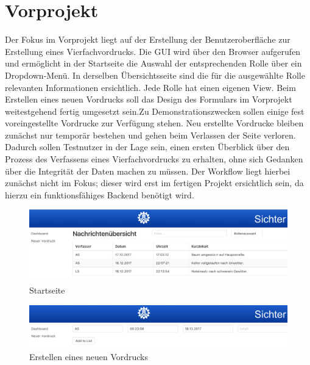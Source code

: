\section{Vorprojekt}
Der Fokus im Vorprojekt liegt auf der Erstellung der Benutzeroberfläche zur Erstellung eines Vierfachvordrucks. 
Die GUI wird über den Browser aufgerufen und ermöglicht in der Startseite die Auswahl der entsprechenden Rolle über 
ein Dropdown-Menü. In derselben Übersichtsseite sind die für die ausgewählte Rolle relevanten Informationen ersichtlich. 
Jede Rolle hat einen eigenen View. Beim Erstellen eines neuen Vordrucks soll das Design des Formulars im Vorprojekt 
weitestgehend fertig umgesetzt sein.Zu Demonstrationszwecken sollen einige fest voreingestellte Vordrucke zur Verfügung stehen. Neu erstellte Vordrucke bleiben zunächst nur temporär bestehen und gehen beim Verlassen der Seite verloren. Dadurch sollen Testnutzer in der Lage sein, einen ersten Überblick über den Prozess des Verfassens eines Vierfachvordrucks zu erhalten,
ohne sich Gedanken über die Integrität der Daten machen zu müssen. Der Workflow liegt hierbei zunächst nicht im Fokus; dieser wird erst im fertigen Projekt ersichtlich sein, da hierzu ein funktionsfähiges Backend benötigt wird.

    \begin{figure}[htpb]
        \centering
        \includegraphics[width=0.95\linewidth]{vorprojekt_01.png}
        \caption{Startseite}
    \end{figure}


    \begin{figure}[htpb]
        \centering
        \includegraphics[width=0.95\linewidth]{vorprojekt_02.png}
        \caption{Erstellen eines neuen Vordrucks}
    \end{figure}
